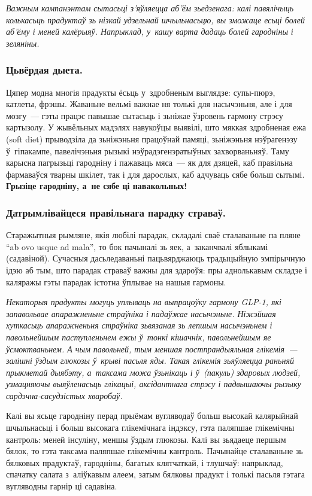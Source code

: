 \emph{Важным кампанэнтам сытасьці з'яўляецца аб'ём зьедзенага: калі павялічыць колькасьць прадуктаў зь нізкай удзельнай шчыльнасьцю, вы зможаце есьці болей аб'ёму і меней калёрыяў. Напрыклад, у~кашу варта дадаць болей гародніны і зеляніны.}

\subsubsection{Цьвёрдая дыета.}
Цяпер модна многія прадукты ёсьць у~здробненым выглядзе: супы-пюрэ, катлеты, фрэшы. Жаваньне вельмі важнае ня толькі для насычэньня, але і для мозгу~--- гэты працэс павышае сытасьць і зьніжае ўзровень гармону стрэсу картызолу. У жывёльных мадэлях навукоўцы выявілі, што мяккая здробненая ежа (soft diet) прыводзіла да зьніжэньня працоўнай памяці, зьніжэньня нэўрагенэзу ў~гіпакампе, павелічэньня рызыкі нэўрадэгенэратыўных захворваньняў. Таму карысна пагрызьці гародніну і пажаваць мяса~--- як для дзяцей, каб правільна фармаваўся тварны шкілет, так і для дарослых, каб адчуваць сябе больш сытымі. \textbf{Грызіце гародніну, а~не сябе ці навакольных!}

\subsubsection{Датрымлівайцеся правільнага парадку страваў.}
Старажытныя рымляне, якія любілі парадак, складалі сваё сталаваньне па пляне ``ab ovo usque ad mala'', то бок пачыналі зь яек, а~заканчвалі яблыкамі (садавіной). Сучасныя дасьледаваньні пацьвярджаюць традыцыйную эмпірычную ідэю аб тым, што парадак страваў важны для здароўя: пры аднолькавым складзе і каляражы гэты парадак істотна ўплывае на нашыя гармоны.

\emph{Некаторыя прадукты могуць уплываць на выпрацоўку гармону GLP-1, які запавольвае апаражненьне страўніка і падаўжае насычэньне. Ніжэйшая хуткасьць апаражненьня страўніка зьвязаная зь лепшым насычэньнем і павольнейшым паступленьнем ежы ў~тонкі кішачнік, павольнейшым яе ўсмоктваньнем. А чым павольней, тым меншая постпрандыяльная глікемія~--- залішні ўздым глюкозы ў~крыві пасьля яды. Такая глікемія зьяўляецца раньняй прыкметай дыябэту, а~таксама можа ўзьнікаць і ў~(пакуль) здаровых людзей, узмацняючы выяўленасьць глікацыі, аксідантнага стрэсу і падвышаючы рызыку сардэчна-сасудзістых хваробаў.}

Калі вы ясьце гародніну перад прыёмам вугляводаў больш высокай калярыйнай шчыльнасьці і больш высокага глікемічнага індэксу, гэта паляпшае глікемічны кантроль: меней інсуліну, меншы ўздым глюкозы. Калі вы зьядаеце першым бялок, то гэта таксама паляпшае глікемічны кантроль. Пачынайце сталаваньне зь бялковых прадуктаў, гародніны, багатых клятчаткай, і тлушчаў: напрыклад, спачатку салата з~аліўкавым алеем, затым бялковы прадукт і толькі пасьля гэтага вугляводны гарнір ці садавіна.

